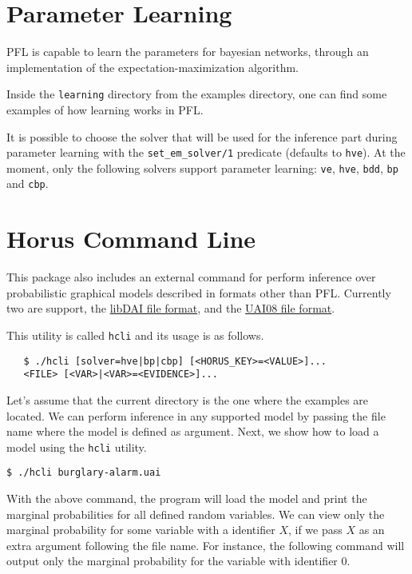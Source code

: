 \documentclass{article}
\begin{document}
\section{Parameter Learning}
PFL is capable to learn the parameters for bayesian networks, through an implementation of the expectation-maximization algorithm.

Inside the \texttt{learning} directory from the examples directory, one can find some examples of how learning works in PFL.

It is possible to choose the solver that will be used for the inference part during parameter learning with the \texttt{set\_em\_solver/1} predicate (defaults to \texttt{hve}). At the moment, only the following solvers support parameter learning: \texttt{ve}, \texttt{hve}, \texttt{bdd}, \texttt{bp} and \texttt{cbp}.




\section{Horus Command Line}
This package also includes an external command for perform inference over probabilistic graphical models described in formats other than PFL. Currently two are support, the \href{http://cs.ru.nl/~jorism/libDAI/doc/fileformats.html}{libDAI file format}, and the \href{http://graphmod.ics.uci.edu/uai08/FileFormat}{UAI08 file format}.

This utility is called \texttt{hcli} and its usage is as follows.

\begin{verbatim}
   $ ./hcli [solver=hve|bp|cbp] [<HORUS_KEY>=<VALUE>]...
   <FILE> [<VAR>|<VAR>=<EVIDENCE>]...
\end{verbatim}

Let's assume that the current directory is the one where the examples are located. We can perform inference in any supported model by passing the file name where the model is defined as argument. Next, we show how to load a model using the \texttt{hcli} utility.

\texttt{\$ ./hcli burglary-alarm.uai}

With the above command, the program will load the model and print the marginal probabilities for all defined random variables. We can view only the marginal probability for some variable with a identifier $X$, if we pass $X$ as an extra argument following the file name. For instance, the following command will output only the marginal probability for the variable with identifier $0$.
\end{document}
